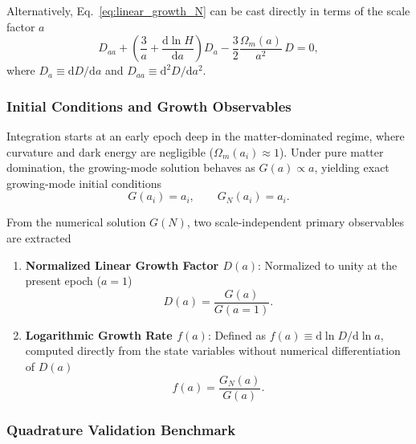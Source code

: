 Alternatively, Eq.~\eqref{eq:linear_growth_N} can be cast directly in terms of the scale factor $a$
    \begin{equation}
        D_{aa} + \left( \frac{3}{a} + \frac{\mathrm{d}\ln H}{\mathrm{d}a} \right) D_a - \frac{3}{2}\frac{\Omega_m(a)}{a^2}\, D = 0,
        \label{eq:linear_growth_a}
    \end{equation}
where $D_a \equiv \mathrm{d}D/\mathrm{d}a$ and $D_{aa} \equiv \mathrm{d}^2D/\mathrm{d}a^2$.

\subsubsection{Initial Conditions and Growth Observables}

Integration starts at an early epoch deep in the matter-dominated regime, where curvature and dark energy are negligible ($\Omega_m(a_i) \approx 1$). Under pure matter domination, the growing-mode solution behaves as $G(a) \propto a$, yielding exact growing-mode initial conditions
    \begin{equation}
        G(a_i) = a_i, \qquad G_N(a_i) = a_i.
        \label{eq:growth_ic}
    \end{equation}
    
From the numerical solution $G(N)$, two scale-independent primary observables are extracted
    \begin{enumerate}
    
        \item \textbf{Normalized Linear Growth Factor $D(a)$}: Normalized to unity at the present epoch ($a = 1$)
            \begin{equation}
                D(a) = \frac{G(a)}{G(a=1)}.
                \label{eq:growth_factor_norm}
            \end{equation}
            
        \item \textbf{Logarithmic Growth Rate $f(a)$}: Defined as $f(a) \equiv \mathrm{d}\ln D/\mathrm{d}\ln a$, computed directly from the state variables without numerical differentiation of $D(a)$
            \begin{equation}
                f(a) = \frac{G_N(a)}{G(a)}.
                \label{eq:growth_rate_f}
            \end{equation}
    \end{enumerate}

\subsubsection{Quadrature Validation Benchmark}

